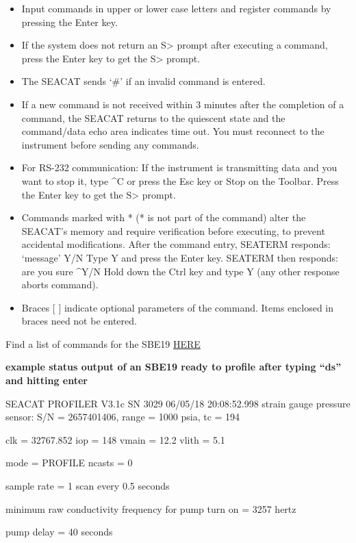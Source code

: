 \documentclass[]{book}
\providecommand{\tightlist}{%
  \setlength{\itemsep}{0pt}\setlength{\parskip}{0pt}}
\begin{document}
\begin{itemize}
\tightlist
\item
  Input commands in upper or lower case letters and register commands by
  pressing the Enter key.
\item
  If the system does not return an S\textgreater{} prompt after
  executing a command, press the Enter key to get the S\textgreater{}
  prompt.
\item
  The SEACAT sends `\#' if an invalid command is entered.
\item
  If a new command is not received within 3 minutes after the completion
  of a command, the SEACAT returns to the quiescent state and the
  command/data echo area indicates time out. You must reconnect to the
  instrument before sending any commands.
\item
  For RS-232 communication: If the instrument is transmitting data and
  you want to stop it, type \^{}C or press the Esc key or Stop on the
  Toolbar. Press the Enter key to get the S\textgreater{} prompt.
\item
  Commands marked with * (* is not part of the command) alter the
  SEACAT's memory and require verification before executing, to prevent
  accidental modifications. After the command entry, SEATERM responds:
  `message' Y/N Type Y and press the Enter key. SEATERM then responds:
  are you sure \^{}Y/N Hold down the Ctrl key and type Y (any other
  response aborts command).
\item
  Braces {[} {]} indicate optional parameters of the command. Items
  enclosed in braces need not be entered.
\end{itemize}

Find a list of commands for the SBE19
\href{https://docs.google.com/document/d/1WkYxlEDpUm_A1JY6Fx7Kq8Fi2c_drbbzcXDoJRtYLZk/edit}{HERE}

\textbf{example status output of an SBE19 ready to profile after typing
``ds'' and hitting enter}

SEACAT PROFILER V3.1c SN 3029 06/05/18 20:08:52.998 strain gauge
pressure sensor: S/N = 2657401406, range = 1000 psia, tc = 194

clk = 32767.852 iop = 148 vmain = 12.2 vlith = 5.1

mode = PROFILE ncasts = 0

sample rate = 1 scan every 0.5 seconds

minimum raw conductivity frequency for pump turn on = 3257 hertz

pump delay = 40 seconds
\end{document}
